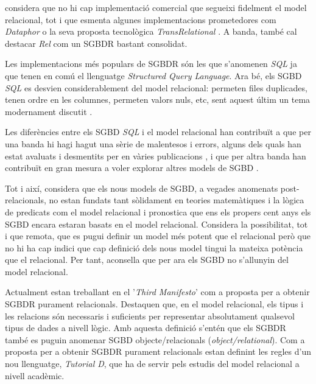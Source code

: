 \textcite[cap.~2]{date06} %
considera que no hi cap implementació comercial que segueixi fidelment
el model relacional, tot i que esmenta algunes implementacions
prometedores com \emph{Dataphor} o la seva proposta tecnològica
\emph{TransRelational} \parencite{date:transrelational}. A banda,
també cal destacar \emph{Rel} \parencite{rel} com un SGBDR bastant
consolidat.

Les implementacions més populars de SGBDR són les que s'anomenen
\emph{SQL} ja que tenen en comú el llenguatge \emph{Structured Query
  Language}. Ara bé, els SGBD \emph{SQL} es desvien considerablement
del model relacional: permeten files duplicades, tenen ordre en les
columnes, permeten valors nuls, etc, sent aquest últim un tema
modernament discutit \parencite{date08:nulls}.

Les diferències entre els SGBD \emph{SQL} i el model relacional han
contribuït a que per una banda hi hagi hagut una sèrie de malentesos i
errors, alguns dels quals han estat avaluats i desmentits per
\citeauthor{dbdebunk} en vàries
publicacions \parencite{dbdebunk,date06}, i que per altra banda han
contribuït en gran mesura a voler explorar altres models de
SGBD \parencite{stonebraker09}.

Tot i així, \textcite[cap.~21--25]{date06} considera que els nous
models de SGBD, a vegades anomenats post-relacionals, no estan fundats
tant sòlidament en teories matemàtiques i la lògica de predicats com
el model relacional i pronostica que ens els propers cent anys els
SGBD encara estaran basats en el model
relacional. %
Considera la possibilitat, tot i que remota, que es pugui definir un
model més potent que el relacional però que no hi ha cap indici que
cap definició dels nous model tingui la mateixa potència que el
relacional. Per tant, aconsella que per ara els SGBD no s'allunyin del
model relacional. %

  
Actualment \textcite{date:thethirdmanifesto} estan treballant en el
'\emph{Third Manifesto}' com a proposta per a obtenir SGBDR purament
relacionals. Destaquen que, en el model relacional, els tipus i les
relacions són necessaris i suficients per representar absolutament
qualsevol tipus de dades a nivell lògic. %
Amb aquesta definició s'entén que els SGBDR també es puguin anomenar
SGBD objecte/relacionals (\emph{object/relational}).  Com a proposta
per a obtenir SGBDR purament relacionals
\textcite{date05,date:tutoriald} estan definint les regles d'un nou
llenguatge, \emph{Tutorial D}, que ha de servir pels estudis del model
relacional a nivell acadèmic.


